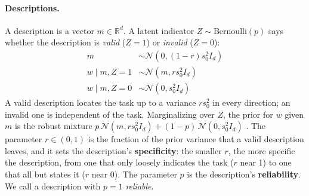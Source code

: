 \documentclass[10pt]{article}
\newcommand{\R}{\mathbb{R}}
\begin{document}
\paragraph{Descriptions.} A description is a vector $m \in \R^d$. A latent indicator $Z \sim \mathrm{Bernoulli}(p)$ says whether the description is \emph{valid} ($Z = 1$) or \emph{invalid} ($Z = 0$):
\begin{align}
    m &\sim \mathcal{N}(0, (1-r)s_0^2 I_d) \\
    w \mid m, Z=1 &\sim \mathcal{N}(m, r s_0^2 I_d) \\
    w \mid m, Z=0 &\sim \mathcal{N}(0, s_0^2 I_d)
\end{align}
A valid description locates the task up to a variance $r s_0^2$ in every direction; an invalid one is independent of the task. Marginalizing over $Z$, the prior for $w$ given $m$ is the robust mixture $p\,\mathcal{N}(m, rs_0^2 I_d) + (1-p)\,\mathcal{N}(0, s_0^2 I_d)$ \citep{schmidli2014}. The parameter $r \in (0, 1)$ is the fraction of the prior variance that a valid description leaves, and it sets the description's \textbf{specificity}: the smaller $r$, the more specific the description, from one that only loosely indicates the task ($r$ near 1) to one that all but states it ($r$ near 0). The parameter $p$ is the description's \textbf{reliability}. We call a description with $p = 1$ \emph{reliable}.
\end{document}
